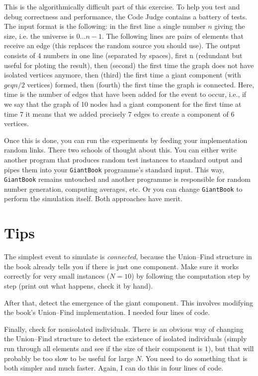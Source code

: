 \documentclass{tufte-handout}
\begin{document}
This is the algorithmically difficult part of this exercise.
To help you test and debug correctness and performance, the Code Judge contains a battery of tests.
The input format is the following: in the first line a single number $n$ giving the size, i.e. the universe is $0\ldots n-1$.
The following lines are pairs of elements that receive an edge (this replaces the random source you should use).
The output consists of 4 numbers in one line (separated by spaces), first n (redundant but useful for ploting the result), then (second) the first time the graph does not have isolated vertices anymore, then (third) the first time a giant component (with $geq n/2$ vertices) formed, then (fourth) the first time the graph is connected. Here, time is the number of edges that have been added for the event to occur, i.e., if we say that the graph of 10 nodes had a giant component for the first time at time 7 it means that we added precisely 7 edges to create a component of 6 vertices.

\medskip
Once this is done, you can run the experiments by feeding your implementation random links.
There two schools of thought about this.
You can either write another program that produces random test instances to standard output and pipes them into your \texttt{GiantBook} programme's standard input.
This way, \texttt{GiantBook} remains untouched and another programme is responsible for random number generation, computing averages, etc.
Or you can change \texttt{GiantBook} to perform the simulation itself.
Both approaches have merit.

\section{Tips}

The simplest event to simulate is \emph{connected}, because
the Union--Find structure in the book already tells you if there is
just one component.
Make sure it works correctly for very small instances ($N=10$) by
following the computation step by step (print out what happens, check
it by hand).

After that, detect the emergence of the giant component.
This involves modifying the book's Union--Find implementation.
I needed four lines of code.

Finally, check for nonisolated individuals.
There is an obvious way of changing the Union--Find structure to detect
the existence of isolated individuals (simply run through all elements
and see if the size of their component is $1$), but that will probably
be too slow to be useful for large $N$.
You need to do something that is both simpler and much faster.
Again, I can do this in four lines of code.
\end{document}
